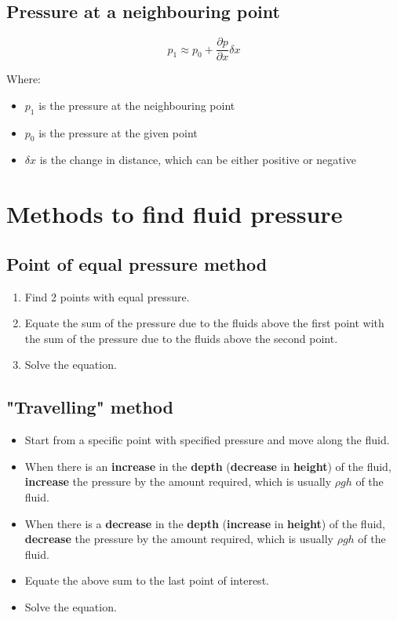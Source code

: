 \documentclass[11pt]{article}
\begin{document}
\subsection{Pressure at a neighbouring point}
\label{sec:orgf50a7ec}
\[p_1 \approx p_0 + \frac{\partial p}{\partial x} \delta x\]

Where:
\begin{itemize}
\item \(p_1\) is the pressure at the neighbouring point
\item \(p_0\) is the pressure at the given point
\item \(\delta x\) is the change in distance, which can be either positive or negative
\end{itemize}

\newpage
\section{Methods to find fluid pressure}
\label{sec:orgd205305}

\subsection{Point of equal pressure method}
\label{sec:org2fcff8e}
\begin{enumerate}
\item Find 2 points with equal pressure.
\item Equate the sum of the pressure due to the fluids above the first point with the sum of the pressure due to the fluids above the second point.
\item Solve the equation.
\end{enumerate}
\subsection{"Travelling" method}
\label{sec:org3407f11}
\begin{itemize}
\item Start from a specific point with specified pressure and move along the fluid.
\item When there is an \textbf{increase} in the \textbf{depth} (\textbf{decrease} in \textbf{height}) of the fluid, \textbf{increase} the pressure by the amount required, which is usually \(\rho g h\) of the fluid.
\item When there is a \textbf{decrease} in the \textbf{depth} (\textbf{increase} in \textbf{height}) of the fluid, \textbf{decrease} the pressure by the amount required, which is usually \(\rho g h\) of the fluid.
\item Equate the above sum to the last point of interest.
\item Solve the equation.
\end{itemize}
\end{document}
